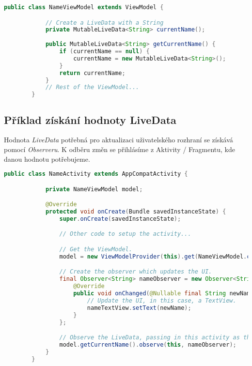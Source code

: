         \begin{lstlisting}[language=Java, caption=Inicializace \emph{LiveData}~\cite{livedata}.]
        public class NameViewModel extends ViewModel {

            // Create a LiveData with a String
            private MutableLiveData<String> currentName();
            
            public MutableLiveData<String> getCurrentName() {
                if (currentName == null) {
                    currentName = new MutableLiveData<String>();
                }
                return currentName;
            }
            // Rest of the ViewModel...
        }
        \end{lstlisting}

        \newpage
        \subsection{Příklad získání hodnoty LiveData}
        Hodnota \emph{LiveData} potřebná pro aktualizaci uživatelského rozhraní se získává pomocí \emph{Observeru}. K odběru změn se přihlásíme z Aktivity / Fragmentu, kde danou hodnotu potřebujeme.

        \begin{lstlisting}[language=Java, caption=Získání hodnoty LiveData~\cite{livedata}]
        public class NameActivity extends AppCompatActivity {

            private NameViewModel model;

            @Override
            protected void onCreate(Bundle savedInstanceState) {
                super.onCreate(savedInstanceState);

                // Other code to setup the activity...

                // Get the ViewModel.
                model = new ViewModelProvider(this).get(NameViewModel.class);

                // Create the observer which updates the UI.
                final Observer<String> nameObserver = new Observer<String>() {
                    @Override
                    public void onChanged(@Nullable final String newName) {
                        // Update the UI, in this case, a TextView.
                        nameTextView.setText(newName);
                    }
                };

                // Observe the LiveData, passing in this activity as the LifecycleOwner and the observer.
                model.getCurrentName().observe(this, nameObserver);
            }
        }
        \end{lstlisting}
